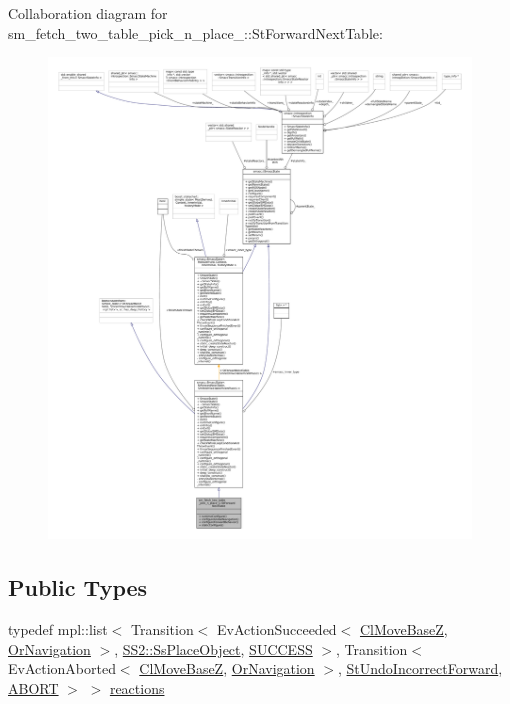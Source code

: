 Collaboration diagram for sm\+\_\+fetch\+\_\+two\+\_\+table\+\_\+pick\+\_\+n\+\_\+place\+\_\+:\+:St\+Forward\+Next\+Table\+:
\nopagebreak
\begin{figure}[H]
\begin{center}
\leavevmode
\includegraphics[width=350pt]{structsm__fetch__two__table__pick__n__place__1_1_1StForwardNextTable__coll__graph}
\end{center}
\end{figure}
\subsection*{Public Types}
\begin{DoxyCompactItemize}
\item 
typedef mpl\+::list$<$ Transition$<$ Ev\+Action\+Succeeded$<$ \hyperlink{classcl__move__base__z_1_1ClMoveBaseZ}{Cl\+Move\+BaseZ}, \hyperlink{classsm__fetch__two__table__pick__n__place__1_1_1OrNavigation}{Or\+Navigation} $>$, \hyperlink{structsm__fetch__two__table__pick__n__place__1_1_1SS2_1_1SsPlaceObject}{S\+S2\+::\+Ss\+Place\+Object}, \hyperlink{classSUCCESS}{S\+U\+C\+C\+E\+SS} $>$, Transition$<$ Ev\+Action\+Aborted$<$ \hyperlink{classcl__move__base__z_1_1ClMoveBaseZ}{Cl\+Move\+BaseZ}, \hyperlink{classsm__fetch__two__table__pick__n__place__1_1_1OrNavigation}{Or\+Navigation} $>$, \hyperlink{structsm__fetch__two__table__pick__n__place__1_1_1StUndoIncorrectForward}{St\+Undo\+Incorrect\+Forward}, \hyperlink{classABORT}{A\+B\+O\+RT} $>$ $>$ \hyperlink{structsm__fetch__two__table__pick__n__place__1_1_1StForwardNextTable_a3f9140610169847ec279db29780746d8}{reactions}
\end{DoxyCompactItemize}
